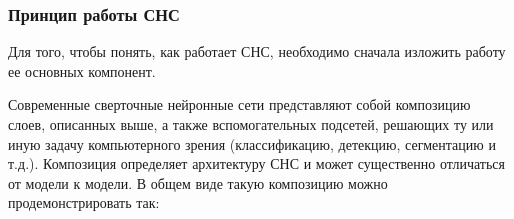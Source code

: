 \subsubsection{Принцип работы СНС}

Для того, чтобы понять, как работает СНС, необходимо сначала изложить работу ее основных компонент.





Современные сверточные нейронные сети представляют собой композицию слоев, описанных выше, а также вспомогательных подсетей, решающих ту или иную задачу компьютерного зрения (классификацию, детекцию, сегментацию и т.д.). Композиция определяет архитектуру СНС и может существенно отличаться от модели к модели. В общем виде такую композицию можно продемонстрировать так:

